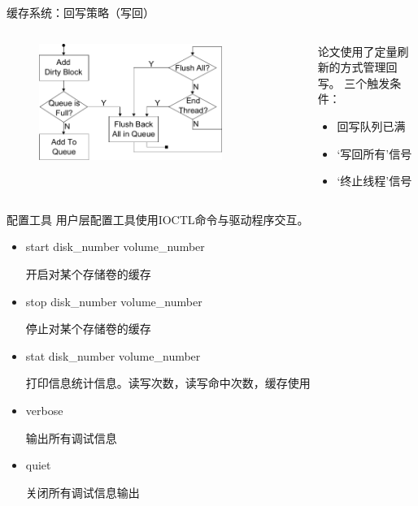 \documentclass[compress]{beamer}
\begin{document}
\begin{frame}{缓存系统：回写策略（写回）}
    \begin{columns}
    \begin{column}{0.5\textwidth}
        \begin{figure}
        \includegraphics[width=0.8\textwidth]{../graph/write-back-thread}
        \end{figure}
    \end{column}
    \begin{column}{0.5\textwidth}
        论文使用了定量刷新的方式管理回写。
        三个触发条件：
        \begin{itemize}
        \item 回写队列已满
        \item ‘写回所有’信号
        \item ‘终止线程’信号
        \end{itemize}
    \end{column}
    \end{columns}
\end{frame}

\begin{frame}{配置工具}
用户层配置工具使用IOCTL命令与驱动程序交互。
\begin{itemize}

\item start   disk\_number   volume\_number

开启对某个存储卷的缓存

\item stop   disk\_number   volume\_number

停止对某个存储卷的缓存

\item stat   disk\_number   volume\_number

打印信息统计信息。读写次数，读写命中次数，缓存使用

\item verbose

输出所有调试信息

\item quiet

关闭所有调试信息输出

\end{itemize}
\end{frame}
\end{document}
